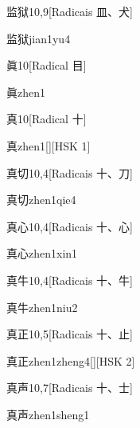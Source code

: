 \begin{entry}{监狱}{10,9}[Radicais ⽫、⽝]
  \begin{phonetics}{监狱}{jian1yu4}
  \end{phonetics}
\end{entry}

\begin{entry}{眞}{10}[Radical ⽬]
  \begin{phonetics}{眞}{zhen1}
  \end{phonetics}
\end{entry}

\begin{entry}{真}{10}[Radical ⼗]
  \begin{phonetics}{真}{zhen1}[][HSK 1]
  \end{phonetics}
\end{entry}

\begin{entry}{真切}{10,4}[Radicais ⼗、⼑]
  \begin{phonetics}{真切}{zhen1qie4}
  \end{phonetics}
\end{entry}

\begin{entry}{真心}{10,4}[Radicais ⼗、⼼]
  \begin{phonetics}{真心}{zhen1xin1}
  \end{phonetics}
\end{entry}

\begin{entry}{真牛}{10,4}[Radicais ⼗、⽜]
  \begin{phonetics}{真牛}{zhen1niu2}
  \end{phonetics}
\end{entry}

\begin{entry}{真正}{10,5}[Radicais ⼗、⽌]
  \begin{phonetics}{真正}{zhen1zheng4}[][HSK 2]
  \end{phonetics}
\end{entry}

\begin{entry}{真声}{10,7}[Radicais ⼗、⼠]
  \begin{phonetics}{真声}{zhen1sheng1}
  \end{phonetics}
\end{entry}

